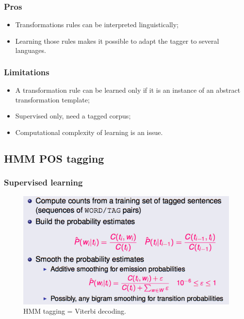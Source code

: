   \subsubsection{Pros}
  \begin{itemize}
  	\item Transformations rules can be interpreted linguistically;
  	\item Learning those rules makes it possible to adapt the tagger to several languages.
  \end{itemize}
  \subsubsection{Limitations}
  \begin{itemize}
  	\item A transformation rule can be learned only if it is an instance of an abstract transformation template;
  	\item Supervised only, need a tagged corpus;
  	\item Computational complexity of learning is an issue.
  \end{itemize}

\subsection{HMM POS tagging}

\subsubsection{Supervised learning}

\begin{figure}[H]
	\centering
	\includegraphics[scale=0.5]{images/38_supervised.png}
 	\caption{HMM tagging = Viterbi decoding.}
\end{figure}

